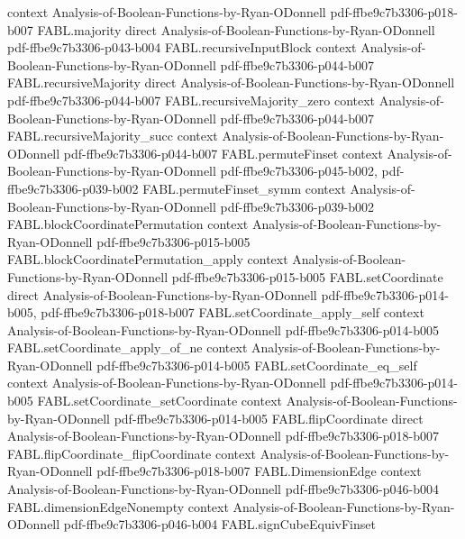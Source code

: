 \begin{theorem}
  {context}
  {Analysis-of-Boolean-Functions-by-Ryan-ODonnell}
  {pdf-ffbe9c7b3306-p018-b007}
\proofstep
  {FABL.majority}
  {direct}
  {Analysis-of-Boolean-Functions-by-Ryan-ODonnell}
  {pdf-ffbe9c7b3306-p043-b004}
\proofstep
  {FABL.recursiveInputBlock}
  {context}
  {Analysis-of-Boolean-Functions-by-Ryan-ODonnell}
  {pdf-ffbe9c7b3306-p044-b007}
\proofstep
  {FABL.recursiveMajority}
  {direct}
  {Analysis-of-Boolean-Functions-by-Ryan-ODonnell}
  {pdf-ffbe9c7b3306-p044-b007}
\proofstep
  {FABL.recursiveMajority_zero}
  {context}
  {Analysis-of-Boolean-Functions-by-Ryan-ODonnell}
  {pdf-ffbe9c7b3306-p044-b007}
\proofstep
  {FABL.recursiveMajority_succ}
  {context}
  {Analysis-of-Boolean-Functions-by-Ryan-ODonnell}
  {pdf-ffbe9c7b3306-p044-b007}
\proofstep
  {FABL.permuteFinset}
  {context}
  {Analysis-of-Boolean-Functions-by-Ryan-ODonnell}
  {pdf-ffbe9c7b3306-p045-b002,
    pdf-ffbe9c7b3306-p039-b002}
\proofstep
  {FABL.permuteFinset_symm}
  {context}
  {Analysis-of-Boolean-Functions-by-Ryan-ODonnell}
  {pdf-ffbe9c7b3306-p039-b002}
\proofstep
  {FABL.blockCoordinatePermutation}
  {context}
  {Analysis-of-Boolean-Functions-by-Ryan-ODonnell}
  {pdf-ffbe9c7b3306-p015-b005}
\proofstep
  {FABL.blockCoordinatePermutation_apply}
  {context}
  {Analysis-of-Boolean-Functions-by-Ryan-ODonnell}
  {pdf-ffbe9c7b3306-p015-b005}
\proofstep
  {FABL.setCoordinate}
  {direct}
  {Analysis-of-Boolean-Functions-by-Ryan-ODonnell}
  {pdf-ffbe9c7b3306-p014-b005,
    pdf-ffbe9c7b3306-p018-b007}
\proofstep
  {FABL.setCoordinate_apply_self}
  {context}
  {Analysis-of-Boolean-Functions-by-Ryan-ODonnell}
  {pdf-ffbe9c7b3306-p014-b005}
\proofstep
  {FABL.setCoordinate_apply_of_ne}
  {context}
  {Analysis-of-Boolean-Functions-by-Ryan-ODonnell}
  {pdf-ffbe9c7b3306-p014-b005}
\proofstep
  {FABL.setCoordinate_eq_self}
  {context}
  {Analysis-of-Boolean-Functions-by-Ryan-ODonnell}
  {pdf-ffbe9c7b3306-p014-b005}
\proofstep
  {FABL.setCoordinate_setCoordinate}
  {context}
  {Analysis-of-Boolean-Functions-by-Ryan-ODonnell}
  {pdf-ffbe9c7b3306-p014-b005}
\proofstep
  {FABL.flipCoordinate}
  {direct}
  {Analysis-of-Boolean-Functions-by-Ryan-ODonnell}
  {pdf-ffbe9c7b3306-p018-b007}
\proofstep
  {FABL.flipCoordinate_flipCoordinate}
  {context}
  {Analysis-of-Boolean-Functions-by-Ryan-ODonnell}
  {pdf-ffbe9c7b3306-p018-b007}
\proofstep
  {FABL.DimensionEdge}
  {context}
  {Analysis-of-Boolean-Functions-by-Ryan-ODonnell}
  {pdf-ffbe9c7b3306-p046-b004}
\proofstep
  {FABL.dimensionEdgeNonempty}
  {context}
  {Analysis-of-Boolean-Functions-by-Ryan-ODonnell}
  {pdf-ffbe9c7b3306-p046-b004}
\proofstep
  {FABL.signCubeEquivFinset}

\end{theorem}
